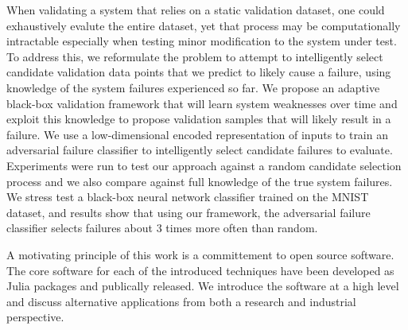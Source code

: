 When validating a system that relies on a static validation dataset, one could exhaustively evalute the entire dataset, yet that process may be computationally intractable especially when testing minor modification to the system under test.
To address this, we reformulate the problem to attempt to intelligently select candidate validation data points that we predict to likely cause a failure, using knowledge of the system failures experienced so far.
We propose an adaptive black-box validation framework that will learn system weaknesses over time and exploit this knowledge to propose validation samples that will likely result in a failure.
We use a low-dimensional encoded representation of inputs to train an adversarial failure classifier to intelligently select candidate failures to evaluate.
Experiments were run to test our approach against a random candidate selection process and we also compare against full knowledge of the true system failures.
We stress test a black-box neural network classifier trained on the MNIST dataset,
and results show that using our framework, the adversarial failure classifier selects failures about $3$ times more often than random.

A motivating principle of this work is a committement to open source software.
The core software for each of the introduced techniques have been developed as Julia packages and publically released.
We introduce the software at a high level and discuss alternative applications from both a research and industrial perspective.